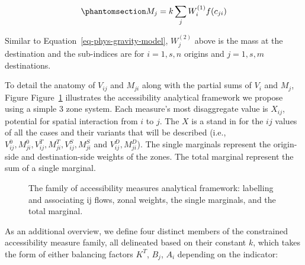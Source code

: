 \documentclass[
]{article}
\begin{document}
\begin{equation}\phantomsection\label{eq-market-potential-01}{
M_{j} = k \sum_j W_i^{(1)} f(c_{ji})
}\end{equation}

Similar to Equation~\ref{eq-phys-gravity-model}, \(W_j^{(2)}\) above is
the mass at the destination and the sub-indices are for \(i = 1,s, n\)
origins and \(j = 1,s, m\) destinations.

To detail the anatomy of \(V_{ij}\) and \(M_{ji}\) along with the
partial sums of \(V_i\) and \(M_j\), Figure
Figure~\ref{fig-analytical-device-conc-accessibility} illustrates the
accessibility analytical framework we propose using a simple 3 zone
system. Each measure's most disaggregate value is \(X_{ij}\), potential
for spatial interaction from \(i\) to \(j\). The \(X\) is a stand in for
the \(ij\) values of all the cases and their variants that will be
described (i.e.,
\(V_{ij}^0, M_{ji}^0, V_{ij}^T, M_{ji}^T, V_{ij}^S, M_{ji}^S\) and
\(V_{ij}^D, M_{ji}^D\)). The single marginals represent the origin-side
and destination-side weights of the zones. The total marginal represent
the sum of a single marginal.

\begin{figure}[H]


\caption{\label{fig-analytical-device-conc-accessibility}The family of
accessibility measures analytical framework: labelling and associating
ij flows, zonal weights, the single marginals, and the total marginal.}

\end{figure}%

As an additional overview, we define four distinct members of the
constrained accessibility measure family, all delineated based on their
constant \(k\), which takes the form of either balancing factors
\(K^T\), \(B_j\), \(A_i\) depending on the indicator:
\end{document}
